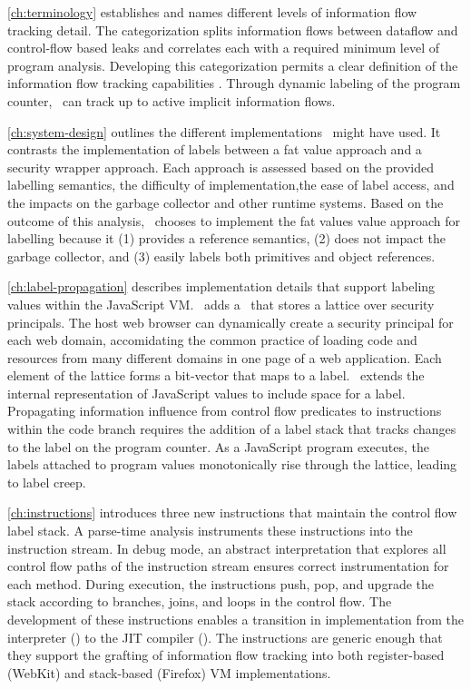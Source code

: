 \autoref{ch:terminology} establishes and names different levels of information flow tracking detail.
The categorization splits information flows between dataflow and control-flow based leaks and correlates each with a required minimum level of program analysis.
Developing this categorization permits a clear definition of the information flow tracking capabilities \FlowCore.
Through dynamic labeling of the program counter, \FlowCore\ can track up to active implicit information flows.

\autoref{ch:system-design} outlines the different implementations \FlowCore\ might have used.
It contrasts the implementation of labels between a fat value approach and a security wrapper approach.
Each approach is assessed based on the provided labelling semantics, the difficulty of implementation,the ease of label access, and the impacts on the garbage collector and other runtime systems.
Based on the outcome of this analysis, \FlowCore\ chooses to implement the fat values value approach for labelling because it (1) provides a reference semantics, (2) does not impact the garbage collector, and (3) easily labels both primitives and object references.

\autoref{ch:label-propagation} describes implementation details that support labeling values within the JavaScript VM.
\FlowCore\ adds a \FlowLabelRegistry\ that stores a lattice over security principals.
The host web browser can dynamically create a security principal for each web domain, accomidating the common practice of loading code and resources from many different domains in one page of a web application.
Each element of the lattice forms a bit-vector that maps to a label.
\FlowCore\ extends the internal representation of JavaScript values to include space for a label.
Propagating information influence from control flow predicates to instructions within the code branch requires the addition of a label stack that tracks changes to the label on the program counter.
As a JavaScript program executes, the labels attached to program values monotonically rise through the lattice, leading to label creep.

\autoref{ch:instructions} introduces three new instructions that maintain the control flow label stack.
A parse-time analysis instruments these instructions into the instruction stream.
In debug mode, an abstract interpretation that explores all control flow paths of the instruction stream ensures correct instrumentation for each method.
During execution, the instructions push, pop, and upgrade the stack according to branches, joins, and loops in the control flow.
The development of these instructions enables a transition in implementation from the interpreter (\FlowCore) to the JIT compiler (\JitFlow).
The instructions are generic enough that they support the grafting of information flow tracking into both register-based (WebKit) and stack-based (Firefox) VM implementations.


